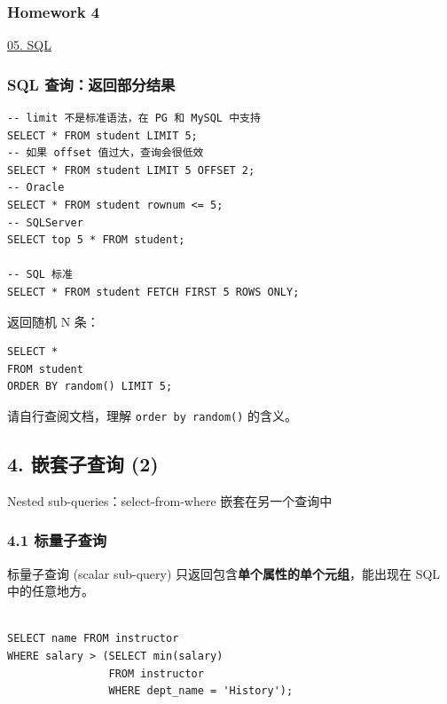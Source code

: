 \documentclass[aspectratio=169, 14pt]{beamer}
\begin{document}
\begin{frame}
    \frametitle{Homework 4}
\href{https://github.com/ChenZhongPu/db-swufe/tree/master/05_sql}{05. SQL}

\end{frame}

\begin{frame}[fragile]
    \frametitle{SQL 查询：返回部分结果}

    \begin{verbatim}
-- limit 不是标准语法，在 PG 和 MySQL 中支持
SELECT * FROM student LIMIT 5;
-- 如果 offset 值过大，查询会很低效
SELECT * FROM student LIMIT 5 OFFSET 2;
-- Oracle
SELECT * FROM student rownum <= 5;
-- SQLServer
SELECT top 5 * FROM student;

-- SQL 标准
SELECT * FROM student FETCH FIRST 5 ROWS ONLY;
    \end{verbatim}

\end{frame}

\begin{frame}[fragile]
返回随机 N 条：

\begin{verbatim}
SELECT * 
FROM student 
ORDER BY random() LIMIT 5; 
\end{verbatim}

请自行查阅文档，理解 \texttt{order by random()} 的含义。

\end{frame}

\begin{frame}
    \section{\textcolor{darkmidnightblue}{4. 嵌套子查询 (2)}}  
    Nested sub-queries：\alert{select-from-where} 嵌套在另一个查询中

\end{frame}

\begin{frame}[fragile]
    \frametitle{4.1 标量子查询}
    标量子查询 (scalar sub-query) 只返回包含\textbf{单个属性的单个元组}，能出现在 SQL 中的任意地方。

\begin{verbatim}

SELECT name FROM instructor
WHERE salary > (SELECT min(salary)
                FROM instructor
                WHERE dept_name = 'History');
\end{verbatim}

\end{frame}
\end{document}
